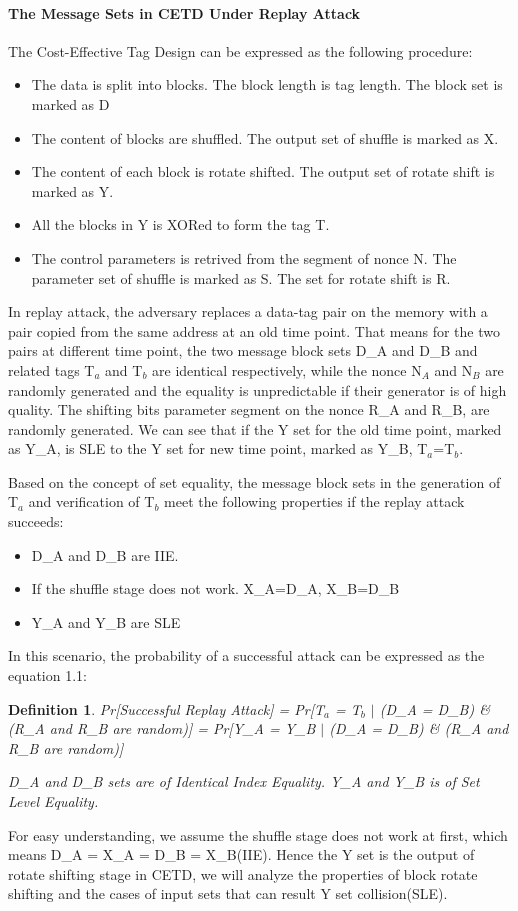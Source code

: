\documentclass{article}
\newtheorem{defination}{Definition}[section]
\begin{document}
\paragraph{The Message Sets in CETD Under Replay Attack}
The Cost-Effective Tag Design can be expressed as the following procedure:
\begin{itemize}
	\item The data is split into blocks. The block length is tag length. The block set is marked as D
	\item The content of blocks are shuffled. The output set of shuffle is marked as X.
	\item The content of each block is rotate shifted. The output set of rotate shift is marked as Y.
	\item All the blocks in Y is XORed to form the tag T.
	\item The control parameters is retrived from the segment of nonce N. The parameter set of shuffle is marked as S. The set for rotate shift is R.
\end{itemize}

In replay attack, the adversary replaces a data-tag pair on the memory with a
pair copied from the same address at an old time point. That means for the two
pairs at different time point, the two message block sets D\_A and D\_B and related tags T$_a$ and T$_b$ are
identical respectively, while the nonce N$_A$ and N$_B$ are randomly generated and
the equality is unpredictable if their generator is of high quality. The shifting bits parameter segment on the nonce R\_A and R\_B, are randomly
generated.
We can see that if the Y set for the old time point, marked as Y\_A, is SLE to the Y set for new time point, marked as Y\_B, T$_a$=T$_b$.

Based on the concept of set equality, the message block sets in the generation of T$_a$ and verification of T$_b$ meet the following properties if the replay attack succeeds:
\begin{itemize}
	\item D\_A and D\_B are IIE.
	\item If the shuffle stage does not work. X\_A=D\_A, X\_B=D\_B
	\item Y\_A and Y\_B are SLE
\end{itemize}

In this scenario, the probability of a successful attack can be expressed as the equation 1.1:
\begin{defination}
Pr[Successful Replay Attack] = Pr[T$_a$ = T$_b$ $\mid$ (D\_A = D\_B) \& (R\_A and R\_B are random)]
							 = Pr[Y\_A = Y\_B $\mid$ (D\_A = D\_B) \& (R\_A and R\_B are random)]
							 
D\_A and D\_B sets are of Identical Index Equality. Y\_A and Y\_B is of Set Level Equality.
\end{defination} 
For easy understanding, we assume the shuffle stage does not work at first, which means D\_A = X\_A = D\_B = X\_B(IIE). Hence the Y set is the output of rotate shifting stage in CETD, we will analyze the properties of block rotate shifting and the cases of input sets that can result Y set collision(SLE). 
\end{document}
